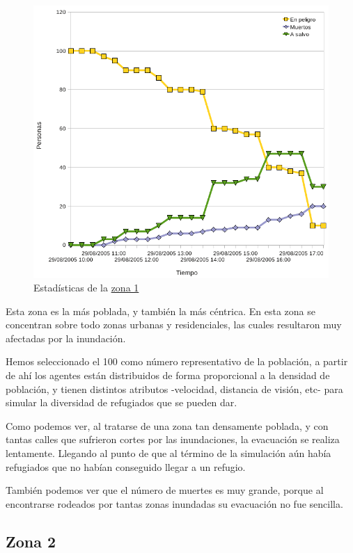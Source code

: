 \begin{figure}[H]
 \centering
 \includegraphics[width=135mm]{figuras/cap6/stats/Zona1.png}
 \caption{Estadísticas de la \hyperref[zona1]{zona 1}}
\end{figure}

Esta zona es la más poblada, y también la más céntrica. En esta zona se
concentran sobre todo zonas urbanas y residenciales, las cuales resultaron muy
afectadas por la inundación.

Hemos seleccionado el 100 como número representativo de la población, a
partir de ahí los agentes están distribuidos de forma proporcional a la
densidad de población, y tienen distintos atributos -velocidad, distancia de
visión, etc- para simular la diversidad de refugiados que se pueden dar.

Como podemos ver, al tratarse de una zona tan densamente poblada, y con tantas
calles que sufrieron cortes por las inundaciones, la evacuación se realiza
lentamente. Llegando al punto de que al término de la simulación aún había
refugiados que no habían conseguido llegar a un refugio.

También podemos ver que el número de muertes es muy grande, porque al
encontrarse rodeados por tantas zonas inundadas su evacuación no fue sencilla.

\subsection{Zona 2}

